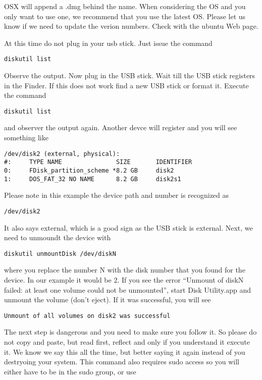 OSX will append a .dmg behind the name. When considering the OS and you
only want to use one, we recommend that you use the latest OS. Please
let us know if we need to update the verion numbers. Check with the
ubuntu Web page.

At this time do not plug in your usb stick. Just issue the command

\begin{verbatim}
diskutil list
\end{verbatim}

Observe the output. Now plug in the USB stick. Wait till the USB stick
registers in the Finder. If this does not work find a new USB stick or
format it. Execute the command

\begin{verbatim}
diskutil list
\end{verbatim}

and observer the output again. Another devce will register and you will
see something like

\begin{verbatim}
/dev/disk2 (external, physical):
#:     TYPE NAME               SIZE       IDENTIFIER
0:     FDisk_partition_scheme *8.2 GB     disk2
1:     DOS_FAT_32 NO NAME      8.2 GB     disk2s1
\end{verbatim}

Please note in this example the device path and number is recognized as

\begin{verbatim}
/dev/disk2
\end{verbatim}

It also says external, which is a good sign as the USB stick is
external. Next, we need to unmoundt the device with

\begin{verbatim}
diskutil unmountDisk /dev/diskN
\end{verbatim}

where you replace the number N with the disk number that you found for
the device. In our example it would be 2. If you see the error ``Unmount
of diskN failed: at least one volume could not be unmounted'', start
Disk Utility.app and unmount the volume (don't eject). If it was
successful, you will see

\begin{verbatim}
Unmount of all volumes on disk2 was successful
\end{verbatim}

The next step is dangerous and you need to make sure you follow it. So
please do not copy and paste, but read first, reflect and only if you
understand it execute it. We know we say this all the time, but better
saying it again instead of you destryoing your system. This command also
requires sudo access so you will either have to be in the sudo group, or
use

